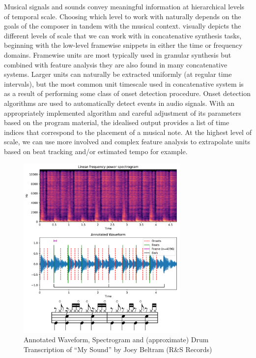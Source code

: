Musical signals and sounds convey meaningful information at hierarchical levels of temporal scale. Choosing which level to work with naturally depends on the goals of the composer in tandem with the musical context.  visually depicts the different levels of scale that we can work with in concatenative synthesis tasks, beginning with the low-level framewise snippets in either the time or frequency domains. Framewise units are most typically used in granular synthesis but combined with feature analysis they are also found in many concatenative systems. Larger units can naturally be extracted uniformly (at regular time intervals), but the most common unit timescale used in concatenative system is as a result of performing some class of onset detection procedure. Onset detection algorithms are used to automatically detect events in audio signals. With an appropriately implemented algorithm and careful adjustment of its parameters based on the program material, the idealised output provides a list of time indices that correspond to the placement of a musical note. At the highest level of scale, we can use more involved and complex feature analysis to extrapolate units based on beat tracking and/or estimated tempo for example.  

\begin{figure}
	\begin{center}
		\includegraphics[width=0.75\textwidth]{ch05_pyconcat/figures/unit_plot.png}
	\end{center}
	\caption[Annotated Waveform, Spectrogram and Drum Transcription of ``My Sound'' by Joey Beltram (R\&S Records)]{Annotated Waveform, Spectrogram and (approximate) Drum Transcription of ``My Sound'' by Joey Beltram (R\&S Records)}
	\label{fig:beltram}
\end{figure}

